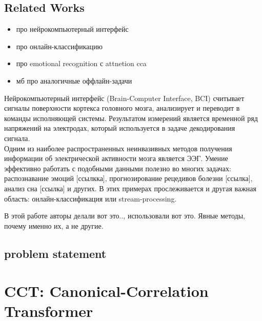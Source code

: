 \documentclass[a4paper,14pt]{article}
\theoremstyle{plain} %
\theoremstyle{definition} %
\theoremstyle{remark} %
\begin{document}
        \subsection{Related Works}
        \begin{itemize}
            \item про нейрокомпьютерный интерфейс
            \item про онлайн-классификацию
            \item про emotional recognition с attnetion cca
            \item мб про аналогичные оффлайн-задачи
        \end{itemize}
        Нейрокомпьютерный интерфейс (Brain-Computer Interface, BCI) \cite{shih2012brain} считывает сигналы поверхности кортекса головного мозга, анализирует и переводит в команды исполняющей системы. Результатом измерений является временной ряд напряжений на электродах, который используется в задаче декодирования сигнала. \\
        Одним из наиболее распространенных неинвазивных методов получения информации об электрической активности мозга является ЭЭГ. Умение эффективно работать с подобными данными полезно во многих задачах: распознавание эмоций [ссылкка], прогнозирование рецедивов болезни [ссылка], анализ сна [ссылка] и других.
        В этих примерах прослеживается и другая важная область: онлайн-классификация или stream-processing. 

        В этой работе авторы делали вот это.., использовали вот это. Явные методы, почему именно их, а не другие.

        \subsection{problem statement}
    
        \section{CCT: Canonical-Correlation Transformer}
\end{document}
